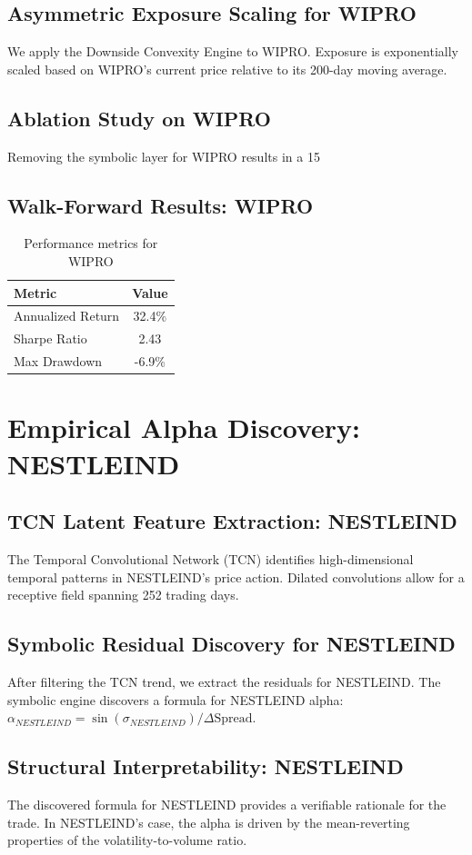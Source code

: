 \documentclass[12pt,a4paper,twoside]{article}
\begin{document}
\subsection{Asymmetric Exposure Scaling for WIPRO}
We apply the Downside Convexity Engine to WIPRO. Exposure is exponentially scaled based on WIPRO's current price relative to its 200-day moving average.
\subsection{Ablation Study on WIPRO}
Removing the symbolic layer for WIPRO results in a 15%
\subsection{Walk-Forward Results: WIPRO}
\begin{table}[H]
\centering
\begin{tabular}{|l|c|}
\hline
Metric & Value \\
\hline
Annualized Return & 32.4\% \\
Sharpe Ratio & 2.43 \\
Max Drawdown & -6.9\% \\
\hline
\end{tabular}
\caption{Performance metrics for WIPRO}
\end{table}
\newpage

\section{Empirical Alpha Discovery: NESTLEIND}
\subsection{TCN Latent Feature Extraction: NESTLEIND}
The Temporal Convolutional Network (TCN) identifies high-dimensional temporal patterns in NESTLEIND's price action. Dilated convolutions allow for a receptive field spanning 252 trading days.
\subsection{Symbolic Residual Discovery for NESTLEIND}
After filtering the TCN trend, we extract the residuals for NESTLEIND. The symbolic engine discovers a formula for NESTLEIND alpha: $\alpha_{NESTLEIND} = \sin(\sigma_{NESTLEIND}) / \Delta \text{Spread}$.
\subsection{Structural Interpretability: NESTLEIND}
The discovered formula for NESTLEIND provides a verifiable rationale for the trade. In NESTLEIND's case, the alpha is driven by the mean-reverting properties of the volatility-to-volume ratio.
\end{document}
